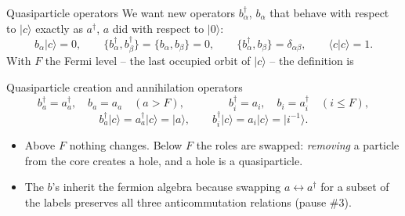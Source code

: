 \documentclass[aspectratio=169,10pt]{beamer}
\newcommand{\ket}[1]{\vert #1\rangle}
\newcommand{\braket}[2]{\langle #1\vert #2\rangle}
\begin{document}
\begin{frame}{Quasiparticle operators}
  We want new operators $b_\alpha^{\dagger}$, $b_\alpha$ that behave with respect to $\ket{c}$ exactly as $a^{\dagger}$, $a$ did with respect to $\ket{0}$:
  \vspace{-0.3em}\[
    b_\alpha\ket{c}=0,\qquad
    \{b_\alpha^{\dagger},b_\beta^{\dagger}\}=\{b_\alpha,b_\beta\}=0,\qquad
    \{b_\alpha^{\dagger},b_\beta\}=\delta_{\alpha\beta},\qquad\braket{c}{c}=1 .
  \]
  With $F$ the \alert{Fermi level} -- the last occupied orbit of $\ket{c}$ -- the definition is
  \begin{block}{Quasiparticle creation and annihilation operators}
    \[
      b_a^{\dagger}=a_a^{\dagger},\quad b_a=a_a\quad(a>F),
      \qquad\qquad
      b_i^{\dagger}=a_i,\quad b_i=a_i^{\dagger}\quad(i\le F),
    \]
    \vspace{-1.2em}
    \[
      b_a^{\dagger}\ket{c}=a_a^{\dagger}\ket{c}=\ket{a},\qquad b_i^{\dagger}\ket{c}=a_i\ket{c}=\ket{i^{-1}}.
    \]
  \end{block}
  \begin{itemize}
    \item Above $F$ nothing changes. Below $F$ the roles are swapped: \emph{removing} a particle from the core creates a \alert{hole}, and a hole is a quasiparticle.
    \item The $b$'s inherit the fermion algebra because swapping $a\leftrightarrow a^{\dagger}$ for a subset of the labels preserves all three anticommutation relations (pause \#3).
  \end{itemize}
\end{frame}
\end{document}
